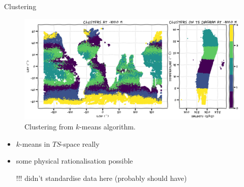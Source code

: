 \documentclass[xcolor=x11names,compress]{beamer}
\renewcommand{\(}{\begin{columns}}
\renewcommand{\)}{\end{columns}}
\newcommand{\<}[1]{\begin{column}{#1}}
\renewcommand{\>}{\end{column}}
\begin{document}

\begin{frame}{Clustering}

\begin{figure}
  \includegraphics[width=\textwidth]{argo_data_Kmean}
  \caption{Clustering from $k$-means algorithm.}
\end{figure}

\begin{itemize}
  \item $k$-means in $TS$-space really
  \item some physical rationalisation possible
  \item[]
  \item[!!!] didn't standardise data here {\tiny (probably should have)}
\end{itemize}

\end{frame}

\end{document}
